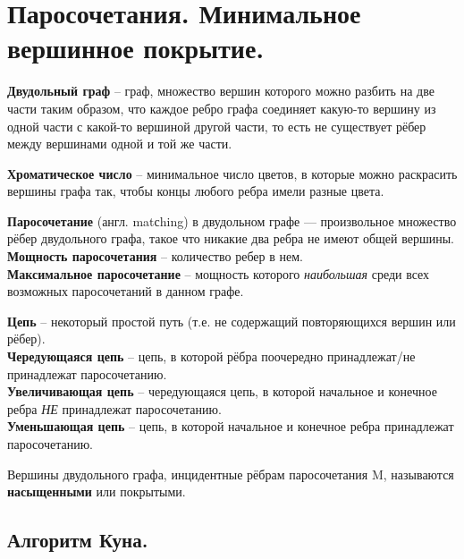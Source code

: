 \section{Паросочетания. Минимальное вершинное покрытие.}%
\label{sec:1. Паросочетания. Минимальное вершинное покрытие.}

\begin{Def}
	\textbf{Двудольный граф} -- граф, множество вершин которого можно разбить на две части таким образом, что каждое ребро графа соединяет какую-то вершину из одной части с какой-то вершиной другой части, то есть не существует рёбер между вершинами одной и той же части.
\end{Def}

\begin{Def}
	\textbf{Хроматическое число} -- минимальное число цветов, в которые можно раскрасить вершины графа так, чтобы концы любого ребра имели разные цвета.
\end{Def}

\begin{Def}
	\textbf{Паросочетание} (англ. matсhing) в двудольном графе — произвольное множество рёбер двудольного графа, такое что никакие два ребра не имеют общей вершины.\\
	\textbf{Мощность паросочетания} -- количество ребер в нем.\\
	\textbf{Максимальное паросочетание} -- мощность которого \textit{наибольшая} среди всех возможных паросочетаний в данном графе.
\end{Def}

\begin{Def}
	\textbf{Цепь} -- некоторый простой путь (т.е. не содержащий повторяющихся вершин или рёбер).\\
	\textbf{Чередующаяся цепь} -- цепь, в которой рёбра поочередно принадлежат/не принадлежат паросочетанию.\\
	\textbf{Увеличивающая цепь} -- чередующаяся цепь, в которой начальное и конечное ребра \textit{НЕ} принадлежат паросочетанию.\\
	\textbf{Уменьшающая цепь} -- цепь, в которой начальное и конечное ребра принадлежат паросочетанию.
\end{Def}

\begin{Def}
	Вершины двудольного графа, инцидентные рёбрам паросочетания M, называются \textbf{насыщенными} или покрытыми. \\
\end{Def}

\subsection*{Алгоритм Куна.}%
\label{sub:Алгоритм Куна.}

